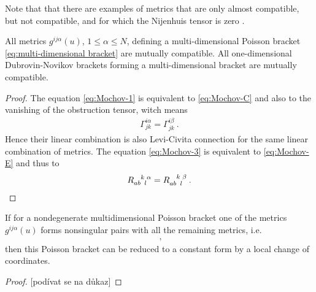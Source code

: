 Note that that there are examples of metrics that are only almost compatible, but not compatible, and for which the Nijenhuis tensor is zero \cite{Mochov-compatibility}. 

\begin{theorem}
    All metrics $g^{ij \alpha}(u)$, $1 \leq \alpha \leq N$, defining a multi-dimensional Poisson bracket \eqref{eq:multi-dimensional bracket} are mutually compatible. All one-dimensional Dubrovin-Novikov brackets forming a multi-dimensional bracket are mutually compatible.
\end{theorem}
\begin{proof}
    The equation \eqref{eq:Mochov-1} is equivalent to \eqref{eq:Mochov-C} and also to the vanishing of the obstruction tensor, witch means
    \begin{align}
        \Gamma^{i\alpha}_{jk} = \Gamma^{i \beta}_{jk} \:.
    \end{align}
    Hence their linear combination is also Levi-Civita connection for the same linear combination of metrics.
    The equation \eqref{eq:Mochov-3} is equivalent to \eqref{eq:Mochov-E} and thus to
    \begin{align}
        R\indices{_a_b^k_l^\alpha} =  R\indices{_a_b^k_l^\beta} \:.
    \end{align}
\end{proof}

\begin{theorem}
    If for a nondegenerate multidimensional Poisson bracket one of the metrics $g^{ij \alpha}(u)$ forms nonsingular pairs with all the remaining metrics, i.e.
    \begin{align}
        \:,
    \end{align}
    then this Poisson bracket can be reduced to a constant form by a local change of coordinates.
\end{theorem}

\begin{proof}
    [podívat se na důkaz]
\end{proof}

